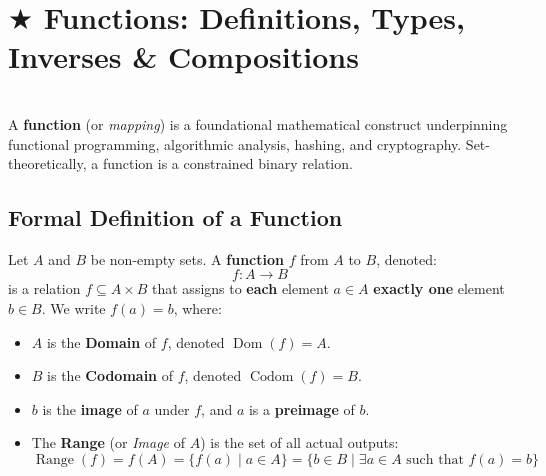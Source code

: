 \documentclass[11pt,a4paper]{article}
\begin{document}
\newpage
\section{\texorpdfstring{$\bigstar$ }{*}Functions: Definitions, Types, Inverses \& Compositions}
\\[4pt]

A \textbf{function} (or \textit{mapping}) is a foundational mathematical construct underpinning functional programming, algorithmic analysis, hashing, and cryptography. Set-theoretically, a function is a constrained binary relation.

\subsection{Formal Definition of a Function}

\begin{defbox}
Let $A$ and $B$ be non-empty sets. A \textbf{function} $f$ from $A$ to $B$, denoted:
\[
f: A \to B
\]
is a relation $f \subseteq A \times B$ that assigns to \textbf{each} element $a \in A$ \textbf{exactly one} element $b \in B$. We write $f(a) = b$, where:
\begin{itemize}
    \item $A$ is the \textbf{Domain} of $f$, denoted $\operatorname{Dom}(f) = A$.
    \item $B$ is the \textbf{Codomain} of $f$, denoted $\operatorname{Codom}(f) = B$.
    \item $b$ is the \textbf{image} of $a$ under $f$, and $a$ is a \textbf{preimage} of $b$.
    \item The \textbf{Range} (or \textit{Image} of $A$) is the set of all actual outputs:
    \[
    \operatorname{Range}(f) = f(A) = \{f(a) \mid a \in A\} = \{b \in B \mid \exists a \in A \text{ such that } f(a) = b\}
    \]
\end{itemize}
\end{defbox}
\end{document}
